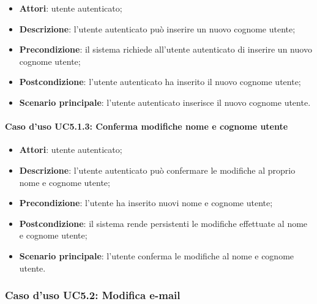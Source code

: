 \begin{itemize}
	\item \textbf{Attori}: utente autenticato;
	\item \textbf{Descrizione}: l'utente autenticato può inserire un nuovo cognome utente;
	\item \textbf{Precondizione}:  il sistema richiede all'utente autenticato di inserire un nuovo cognome utente;
	\item \textbf{Postcondizione}:  l'utente autenticato ha inserito il nuovo cognome utente;
	\item \textbf{Scenario principale}: l'utente autenticato inserisce il nuovo cognome utente.
\end{itemize}

\paragraph{Caso d'uso UC5.1.3: Conferma modifiche nome e cognome utente}

\begin{itemize}
	\item \textbf{Attori}: utente autenticato;
	\item \textbf{Descrizione}: l'utente autenticato può confermare le modifiche al proprio nome e cognome utente;
	\item \textbf{Precondizione}: l'utente ha inserito nuovi nome e cognome utente;
	\item \textbf{Postcondizione}: il sistema rende persistenti le modifiche effettuate al nome e cognome utente;
	\item \textbf{Scenario principale}: l'utente conferma le modifiche al nome e cognome utente.
\end{itemize}

\subsubsection{Caso d'uso UC5.2: Modifica e-mail}

